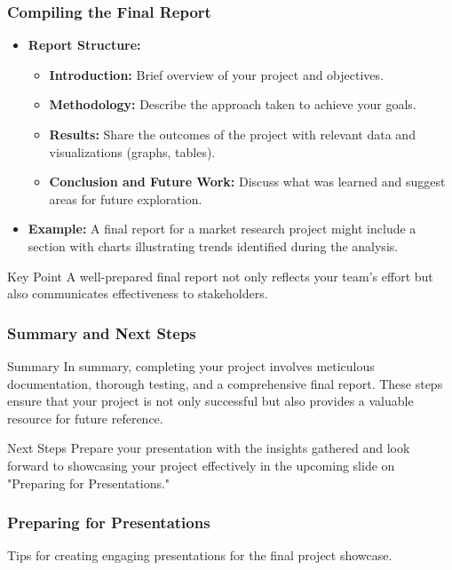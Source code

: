\documentclass{beamer}
\begin{document}
\begin{frame}[fragile]
    \frametitle{Compiling the Final Report}
    \begin{itemize}
        \item \textbf{Report Structure:}
        \begin{itemize}
            \item \textbf{Introduction:} Brief overview of your project and objectives.
            \item \textbf{Methodology:} Describe the approach taken to achieve your goals.
            \item \textbf{Results:} Share the outcomes of the project with relevant data and visualizations (graphs, tables).
            \item \textbf{Conclusion and Future Work:} Discuss what was learned and suggest areas for future exploration.
        \end{itemize}
        \item \textbf{Example:} A final report for a market research project might include a section with charts illustrating trends identified during the analysis.
    \end{itemize}
    \begin{block}{Key Point}
        A well-prepared final report not only reflects your team's effort but also communicates effectiveness to stakeholders.
    \end{block}
\end{frame}

\begin{frame}[fragile]
    \frametitle{Summary and Next Steps}
    \begin{block}{Summary}
        In summary, completing your project involves meticulous documentation, thorough testing, and a comprehensive final report. 
        These steps ensure that your project is not only successful but also provides a valuable resource for future reference.
    \end{block}
    \begin{block}{Next Steps}
        Prepare your presentation with the insights gathered and look forward to showcasing your project effectively in the upcoming slide on 
        "Preparing for Presentations."
    \end{block}
\end{frame}

\begin{frame}[fragile]
    \frametitle{Preparing for Presentations}
    Tips for creating engaging presentations for the final project showcase.
\end{frame}
\end{document}
